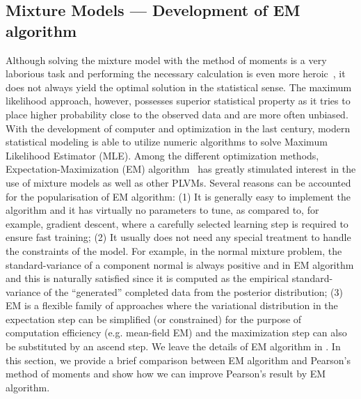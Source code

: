 \subsection{Mixture Models --- Development of EM algorithm}

Although solving the mixture model with the method of moments is a very
laborious task and performing the necessary calculation is even more
heroic~\cite{mclachlan2004finite}, it does not always yield the optimal solution
in the statistical sense. The maximum likelihood approach, however, possesses
superior statistical property as it tries to place higher probability close to
the observed data and are more often unbiased. With the development of computer
and optimization in the last century, modern statistical modeling is able to
utilize numeric algorithms to solve Maximum Likelihood Estimator (MLE).  Among
the different optimization methods, Expectation-Maximization (EM)
algorithm~\cite{dempster1977maximum} has greatly stimulated interest in the use
of mixture models as well as other PLVMs. Several reasons can be accounted for
the popularisation of EM algorithm: (1) It is generally easy to implement the
algorithm and it has virtually no parameters to tune, as compared to, for
example, gradient descent, where a carefully selected learning step is required
to ensure fast training; (2) It usually does not need any special treatment to
handle the constraints of the model. For example, in the normal mixture problem,
the standard-variance of a component normal is always positive and in EM
algorithm and this is naturally satisfied since it is computed as the empirical
standard-variance of the ``generated'' completed data from the posterior
distribution; (3) EM is a flexible family of approaches where the variational
distribution in the expectation step can be simplified (or constrained) for the
purpose of computation efficiency (e.g. mean-field EM) and the maximization step
can also be substituted by an ascend step. We leave the details of EM algorithm
in .  In this section, we provide a brief comparison
between EM algorithm and Pearson's method of moments and show how we can
improve Pearson's result by EM algorithm.


